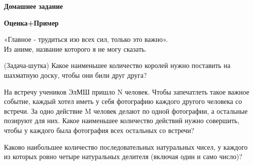 \centerline{\bf \Huge Домашнее задание}
\centerline{\bf \Huge Оценка+Пример}

\begin{flushright}
        \scriptsize{«Главное - трудиться изо всех сил, только это важно».\\Из аниме, название которого я не могу сказать.}
\end{flushright}


 (Задача-шутка) Какое наименьшее количество королей нужно поставить на шахматную доску, чтобы они били друг друга?

 На встречу учеников ЭлМШ пришло N человек. Чтобы запечатлеть такое важное событие, каждый хотел иметь у себя фотографию каждого другого человека со встречи. За одно действие M человек делают по одной фотографии, а остальные позируют для них. Какое наименьшее количество действий нужно совершить, чтобы у каждого была фотография всех остальных со встречи?
  
 Каково наибольшее количество последовательных натуральных чисел, у каждого из которых ровно четыре натуральных делителя (включая один и само число)?